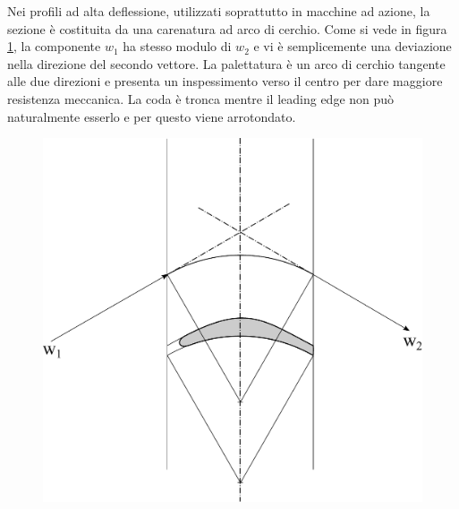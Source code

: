Nei profili ad alta deflessione, utilizzati soprattutto in macchine ad azione, la sezione è costituita da una carenatura ad arco di cerchio. Come si vede in figura \ref{fig:palaBassaDef}, la componente $w_1$ ha stesso modulo di $w_2$ e vi è semplicemente una deviazione nella direzione del secondo vettore. La palettatura è un arco di cerchio tangente alle due direzioni e presenta un inspessimento verso il centro per dare maggiore resistenza meccanica. La coda è tronca mentre il leading edge non può naturalmente esserlo e per questo viene arrotondato. 
\begin{figure}
\centering
  \includegraphics[width=.6\textwidth]{fig/palaBassaDef.pdf}
\caption{}
\label{fig:palaBassaDef}
\end{figure}

